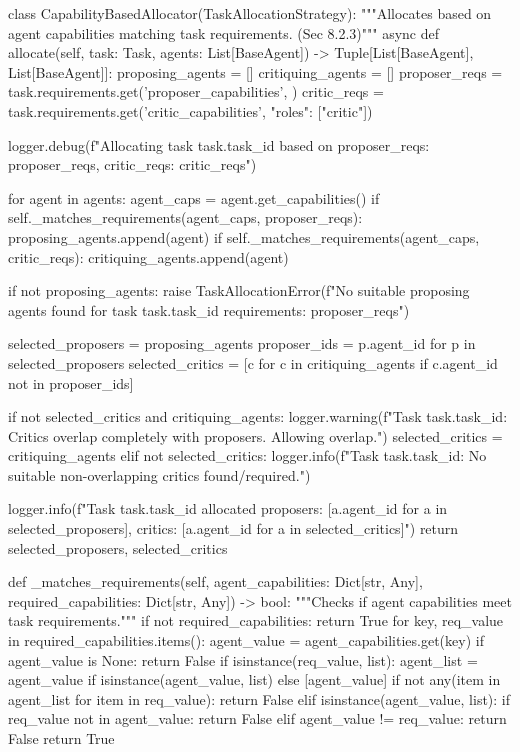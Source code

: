 \documentclass{amsbook}
\theoremstyle{definition}
\theoremstyle{remark}
\numberwithin{equation}{chapter} %
\begin{document}
\begin{python}
class CapabilityBasedAllocator(TaskAllocationStrategy):
    """Allocates based on agent capabilities matching task requirements. (Sec 8.2.3)"""
    async def allocate(self, task: Task, agents: List[BaseAgent]) -> Tuple[List[BaseAgent], List[BaseAgent]]:
        proposing_agents = []
        critiquing_agents = []
        proposer_reqs = task.requirements.get('proposer_capabilities', {})
        critic_reqs = task.requirements.get('critic_capabilities', {"roles": ["critic"]})

        logger.debug(f"Allocating task {task.task_id} based on proposer_reqs: {proposer_reqs}, critic_reqs: {critic_reqs}")

        for agent in agents:
            agent_caps = agent.get_capabilities()
            if self._matches_requirements(agent_caps, proposer_reqs):
                proposing_agents.append(agent)
            if self._matches_requirements(agent_caps, critic_reqs):
                critiquing_agents.append(agent)

        if not proposing_agents:
            raise TaskAllocationError(f"No suitable proposing agents found for task {task.task_id} requirements: {proposer_reqs}")

        selected_proposers = proposing_agents
        proposer_ids = {p.agent_id for p in selected_proposers}
        selected_critics = [c for c in critiquing_agents if c.agent_id not in proposer_ids]

        if not selected_critics and critiquing_agents:
             logger.warning(f"Task {task.task_id}: Critics overlap completely with proposers. Allowing overlap.")
             selected_critics = critiquing_agents
        elif not selected_critics:
             logger.info(f"Task {task.task_id}: No suitable non-overlapping critics found/required.")

        logger.info(f"Task {task.task_id} allocated proposers: {[a.agent_id for a in selected_proposers]}, critics: {[a.agent_id for a in selected_critics]}")
        return selected_proposers, selected_critics

    def _matches_requirements(self, agent_capabilities: Dict[str, Any], required_capabilities: Dict[str, Any]) -> bool:
        """Checks if agent capabilities meet task requirements."""
        if not required_capabilities: return True
        for key, req_value in required_capabilities.items():
            agent_value = agent_capabilities.get(key)
            if agent_value is None: return False
            if isinstance(req_value, list):
                agent_list = agent_value if isinstance(agent_value, list) else [agent_value]
                if not any(item in agent_list for item in req_value): return False
            elif isinstance(agent_value, list):
                if req_value not in agent_value: return False
            elif agent_value != req_value: return False
        return True



\end{python}
\end{document}
